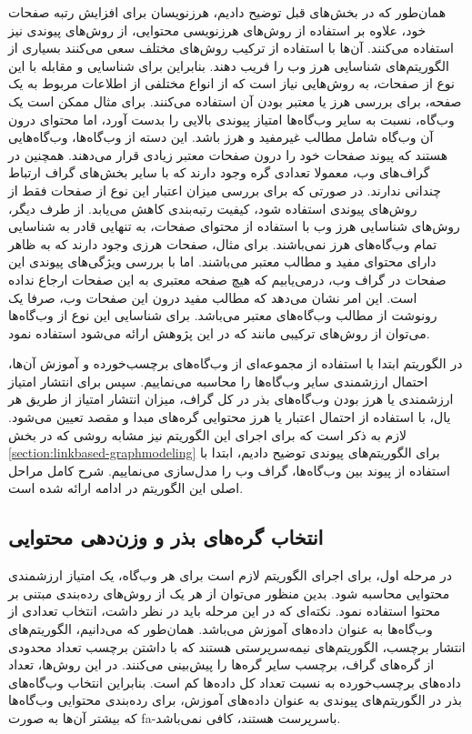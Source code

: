 \documentclass[twoside, a4paper,11pt]{book}
\numberwithin{equation}{chapter}
\numberwithin{table}{chapter}
\numberwithin{figure}{chapter}
\numberwithin{equation}{chapter}
\newcommand{\mls}[1]{\gls{fa-#1}\glsuseri{la-#1}}
\begin{document}
همان‌طور که در بخش‌های قبل توضیح دادیم، هرزنویسان برای افزایش رتبه صفحات خود، علاوه بر استفاده از روش‌های هرزنویسی محتوایی، از روش‌های پیوندی نیز استفاده می‌کنند. آن‌ها با استفاده از ترکیب روش‌های مختلف سعی می‌کنند بسیاری از الگوریتم‌های شناسایی هرز وب را فریب دهند. بنابراین برای شناسایی و مقابله با این نوع از صفحات، به روش‌هایی نیاز است که از انواع مختلفی از اطلاعات مربوط به یک صفحه، برای بررسی هرز یا معتبر بودن آن استفاده می‌کنند. برای مثال ممکن است یک وب‌گاه، نسبت به سایر وب‌گاه‌ها امتیاز پیوندی بالایی را بدست آورد، اما محتوای درون آن وب‌گاه شامل مطالب غیرمفید و هرز باشد. این دسته از وب‌گاه‌ها، وب‌گاه‌هایی هستند که پیوند صفحات خود را درون صفحات معتبر زیادی قرار می‌دهند. همچنین در گراف‌های وب، معمولا تعدادی گره وجود دارند که با سایر بخش‌های گراف ارتباط چندانی ندارند. در صورتی که  برای بررسی میزان اعتبار این نوع از صفحات فقط از روش‌های پیوندی استفاده شود، کیفیت رتبه‌بندی کاهش می‌یابد. از طرف دیگر، روش‌های شناسایی هرز وب با استفاده از محتوای صفحات، به تنهایی قادر به شناسایی تمام وب‌گاه‌های هرز نمی‌باشند. برای مثال، صفحات هرزی وجود دارند که به ظاهر دارای محتوای مفید و مطالب معتبر می‌باشند. اما با بررسی ویژگی‌های پیوندی این صفحات در گراف وب، درمی‌یابیم که هیچ صفحه معتبری به این صفحات ارجاع نداده است. این امر نشان می‌دهد که مطالب مفید درون این صفحات وب، صرفا یک رونوشت از مطالب وب‌گاه‌های معتبر می‌باشد.
برای شناسایی این نوع از وب‌گاه‌ها می‌توان از روش‌های ترکیبی مانند  که در این پژوهش ارائه می‌شود استفاده نمود.

در الگوریتم  ابتدا با استفاده از مجموعه‌ای از وب‌گاه‌های برچسب‌خورده و آموزش آن‌ها، احتمال ارزشمندی سایر وب‌گاه‌ها را محاسبه می‌نماییم. سپس برای انتشار امتیاز ارزشمندی یا هرز بودن وب‌گاه‌های بذر در کل گراف، میزان انتشار امتیاز از طریق هر یال، با استفاده از احتمال‌ اعتبار یا هرز محتوایی گره‌های مبدا و مقصد تعیین می‌شود. لازم به ذکر است که برای اجرای این الگوریتم نیز مشابه روشی که در بخش \ref{section:linkbased-graphmodeling} برای الگوریتم‌های پیوندی توضیح دادیم، ابتدا با استفاده  از پیوند بین وب‌گاه‌ها، گراف وب را مدل‌سازی می‌نماییم. شرح کامل مراحل اصلی این الگوریتم در ادامه ارائه شده است. 
\subsection{انتخاب گره‌های بذر و وزن‌دهی محتوایی}
\label{section:contentandlinkbased-seedandcw}
در مرحله اول، برای اجرای الگوریتم  لازم است برای هر وب‌گاه، یک امتیاز ارزشمندی محتوایی محاسبه شود. بدین منظور می‌توان از هر یک از روش‌‌های رده‌بندی مبتنی بر محتوا استفاده نمود. نکته‌ای که در این مرحله باید در نظر داشت، انتخاب تعدادی از وب‌گاه‌ها به عنوان داده‌های آموزش می‌باشد. همان‌طور که می‌دانیم، الگوریتم‌های انتشار برچسب، الگوریتم‌های نیمه‌سرپرستی هستند که با داشتن برچسب تعداد محدودی از گره‌های گراف، برچسب سایر گره‌ها را پیش‌بینی می‌کنند. در این روش‌ها، تعداد داده‌های برچسب‌خورده به نسبت تعداد کل داده‌‌ها کم است. بنابراین انتخاب وب‌گاه‌های بذر در الگوریتم‌های پیوندی به عنوان داده‌های آموزش، برای رده‌بندی محتوایی وب‌گاه‌ها که بیشتر آن‌ها به صورت \mls{با‌سرپرست}  هستند، کافی نمی‌باشد.  
\end{document}
